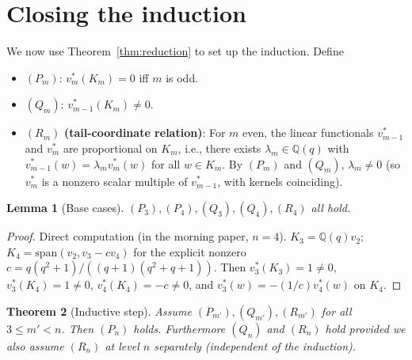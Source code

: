 \documentclass[11pt]{article}
\newtheorem{theorem}{Theorem}
\newtheorem{lemma}[theorem]{Lemma}
\theoremstyle{definition}
\begin{document}
\section{Closing the induction}\label{sec:induction}

We now use Theorem~\ref{thm:reduction} to set up the induction.
Define
\begin{itemize}[topsep=0.3em,itemsep=0.2em,leftmargin=2em]
\item $(P_m)$: $v_m^*(K_m) = 0$ iff $m$ is odd.
\item $(Q_m)$: $v_{m-1}^*(K_m) \neq 0$.
\item $(R_m)$ \textbf{(tail-coordinate relation)}: For $m$ even,
  the linear functionals $v_{m-1}^*$ and $v_m^*$ are proportional
  on $K_m$, i.e., there exists $\lambda_m \in \mathbb{Q}(q)$ with
  $v_{m-1}^*(w) = \lambda_m v_m^*(w)$ for all $w \in K_m$.
  By $(P_m)$ and $(Q_m)$, $\lambda_m \neq 0$ (so $v_m^*$ is a nonzero
  scalar multiple of $v_{m-1}^*$, with kernels coinciding).
\end{itemize}

\begin{lemma}[Base cases]\label{lem:base}
$(P_3),(P_4),(Q_3),(Q_4),(R_4)$ all hold.
\end{lemma}

\begin{proof}
Direct computation (in the morning paper, $n=4$). $K_3 = \mathbb{Q}(q)v_2$;
$K_4 = \mathrm{span}(v_2, v_3 - c v_4)$ for the explicit nonzero
$c = q(q^2+1)/((q+1)(q^2+q+1))$. Then $v_3^*(K_3)=1\neq 0$,
$v_3^*(K_4) = 1 \neq 0$, $v_4^*(K_4) = -c \neq 0$, and
$v_3^*(w) = -(1/c) v_4^*(w)$ on $K_4$.
\end{proof}

\begin{theorem}[Inductive step]\label{thm:induction}
Assume $(P_{m'}),(Q_{m'}),(R_{m'})$ for all $3 \le m' < n$. Then
$(P_n)$ holds. Furthermore $(Q_n)$ and $(R_n)$ hold provided we
also assume $(R_n)$ at level $n$ separately (independent of the
induction).
\end{theorem}
\end{document}
